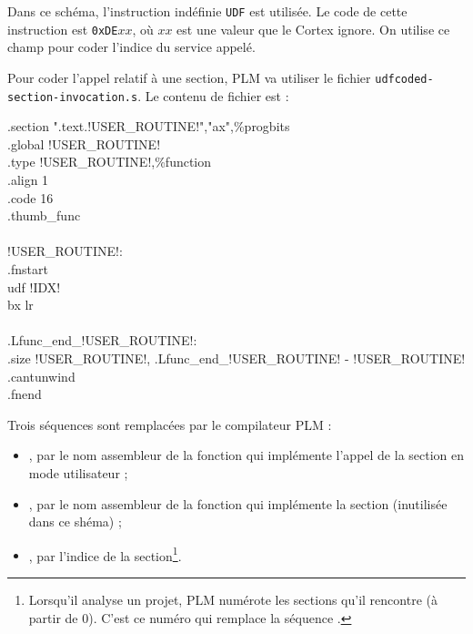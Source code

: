 Dans ce schéma, l'instruction indéfinie \texttt{UDF} est utilisée. Le code de cette instruction est \texttt{0xDE$xx$}, où $xx$ est une valeur que le Cortex ignore. On utilise ce champ pour coder l'indice du service appelé.

Pour coder l'appel relatif à une section, PLM va utiliser le fichier \texttt{udfcoded-section-invocation.s}. Le contenu de fichier est :
\begin{SHELL}\small
\hspace*{1.2em}.section  ".text.!USER\_ROUTINE!","ax",\%progbits\\
\hspace*{1.2em}.global !USER\_ROUTINE!\\
\hspace*{1.2em}.type  !USER\_ROUTINE!,\%function\\
\hspace*{1.2em}.align  1\\
\hspace*{1.2em}.code  16\\
\hspace*{1.2em}.thumb\_func\\
\\
!USER\_ROUTINE!:\\
\hspace*{1.2em}.fnstart\\
\hspace*{1.2em}udf !IDX!\\
\hspace*{1.2em}bx  lr\\
\\
.Lfunc\_end\_!USER\_ROUTINE!:\\
\hspace*{1.2em}.size  !USER\_ROUTINE!, .Lfunc\_end\_!USER\_ROUTINE! - !USER\_ROUTINE!\\
\hspace*{1.2em}.cantunwind\\
\hspace*{1.2em}.fnend
\end{SHELL}

Trois séquences sont remplacées par le compilateur PLM :
\begin{itemize}
\item {}, par le nom assembleur de la fonction qui implémente l'appel de la section en mode utilisateur ;
\item {}, par le nom assembleur de la fonction qui implémente la section (inutilisée dans ce shéma) ;
\item {}, par l'indice de la section\footnote{Lorsqu'il analyse un projet, PLM numérote les sections qu'il rencontre (à partir de $0$). C'est ce numéro qui remplace la séquence .}.
\end{itemize}

